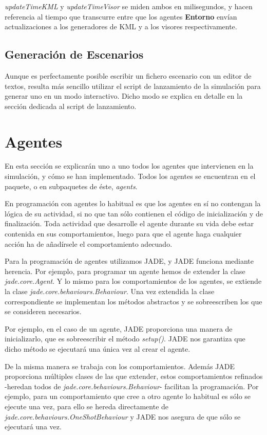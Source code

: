 {\em updateTimeKML} y {\em updateTimeVisor} se miden ambos en milisegundos, y
hacen referencia al tiempo que transcurre entre que los agentes {\bf Entorno}
envían actualizaciones a los generadores de KML y a los visores respectivamente.

\subsection*{Generación de Escenarios}

Aunque es perfectamente posible escribir un fichero escenario con un editor de
textos, resulta más sencillo utilizar el script de lanzamiento de la simulación
para generar uno en un modo interactivo. Dicho modo se explica en detalle en la
sección dedicada al script de lanzamiento.

\section*{Agentes}

En esta sección se explicarán uno a uno todos los agentes que intervienen en la
simulación, y cómo se han implementado. Todos los agentes se encuentran en el
paquete, o en subpaquetes de éste, {\em agents}.


En programación con agentes lo habitual es que los agentes en sí no contengan
la lógica de su actividad, si no que tan sólo contienen el código de
inicialización y de finalización. Toda actividad que desarrolle el agente
durante su vida debe estar contenida en sus comportamientos, luego para que el
agente haga cualquier acción ha de añadírsele el comportamiento adecuado.

Para la programación de agentes utilizamos JADE, y JADE funciona mediante
herencia. Por ejemplo, para programar un agente hemos de extender la clase {\em
jade.core.Agent}. Y lo mismo para los comportamientos de los agentes, se
extiende la clase {\em jade.core.behaviours.Behaviour}. Una vez extendida la
clase correspondiente se implementan los métodos abstractos y se sobreescriben
los que se consideren necesarios.

Por ejemplo, en el caso de un agente, JADE proporciona una manera de
inicializarlo, que es sobreescribir el método {\em setup()}. JADE nos garantiza
que dicho método se ejecutará una única vez al crear el agente.

De la misma manera se trabaja con los comportamientos. Además JADE proporciona
múltiples clases de las que extender, estos comportamientos refinados -heredan
todos de {\em jade.core.behaviours.Behaviour}- facilitan la programación. Por
ejemplo, para un comportamiento que cree a otro agente lo habitual es sólo se
ejecute una vez, para ello se hereda directamente de {\em
jade.core.behaviours.OneShotBehaviour} y JADE nos asegura de que sólo se
ejecutará una vez.

